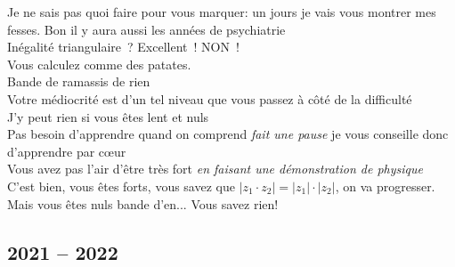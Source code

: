\documentclass[french, a4paper, openany]{book}
\begin{document}
	\og Je ne sais pas quoi faire pour vous marquer: un jours je vais vous montrer mes fesses. Bon il y aura aussi les années de psychiatrie \fg \\
	\og Inégalité triangulaire~? Excellent~! NON~! \fg \\
	\og Vous calculez comme des patates. \fg \\
	\og Bande de ramassis de rien \fg \\
	\og Votre médiocrité est d'un tel niveau que vous passez à côté de la difficulté \fg \\
	\og J'y peut rien si vous êtes lent et nuls \fg \\
	\og Pas besoin d'apprendre quand on comprend \emph{fait une pause} je vous conseille donc d'apprendre par cœur \fg \\
	\og Vous avez pas l'air d'être très fort \fg \emph{en faisant une démonstration de physique} \\
	\og C'est bien, vous êtes forts, vous savez que $\lvert z_1 \cdot z_2 \rvert = \lvert z_1 \rvert \cdot \lvert z_2 \rvert$, on va progresser. Mais vous êtes nuls bande d'en... Vous savez rien! \fg \\

	\subsection*{2021 -- 2022}
\end{document}
